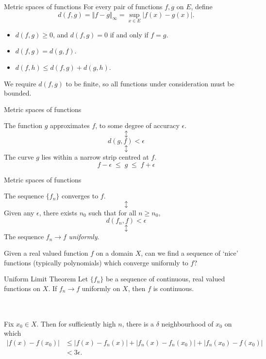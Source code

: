 \documentclass{beamer}
\begin{document}
    \begin{frame}{Metric spaces of functions}
        For every pair of functions $f, g$ on $E$, define \[
            d(f, g) = \Vert f - g\Vert_\infty = \sup_{x \in E} |f(x) - g(x)|.
        \] 

        \begin{itemize}
            \item $d(f, g) \geq 0$, and $d(f, g) = 0$ if and only if $f = g$.
            \item $d(f, g) = d(g, f)$.
            \item $d(f, h) \leq d(f, g) + d(g, h)$.
        \end{itemize}

        We require $d(f, g)$ to be finite, so all functions under consideration must be
        bounded.
    \end{frame}

    \begin{frame}{Metric spaces of functions}
    \begin{center}
    The function $g$ approximates $f$, to some degree of accuracy $\epsilon$.
    \[\updownarrow\]
    \[
        d(g, f) < \epsilon
    \]
    \[\updownarrow\]
    The curve $g$ lies within a narrow strip centred at $f$.
    \[
        f - \epsilon \;\leq\; g \;\leq\; f + \epsilon
    \] 
    \end{center}
    \end{frame}
   
    \begin{frame}{Metric spaces of functions}
    \begin{center}
        The sequence $\{f_n\}$ converges to $f$.
        \[\updownarrow\]
        Given any $\epsilon$, there exists $n_0$ such that for all $n \geq n_0$,
        \[
        d(f_n, f) < \epsilon
        \]
        \[\updownarrow\]
        The sequence $f_n \to f$ \emph{uniformly}.
    \end{center}
    \end{frame}

    \begin{frame}
        Given a real valued function $f$ on a domain $X$, can we find a sequence of
        `nice' functions (typically polynomials) which converge uniformly to $f$?
    \end{frame}
   
    \begin{frame}{Uniform Limit Theorem}
        Let $\{f_n\}$ be a sequence of continuous, real valued functions on $X$. If
        $f_n \to f$ uniformly on $X$, then $f$ is continuous.

        \\~\\

        Fix $x_0 \in X$. Then for sufficiently high $n$, there is a $\delta$
        neighbourhood of $x_0$ on which
        \begin{align*}
            |f(x) - f(x_0)|
                &\leq |f(x) - f_n(x)| + |f_n(x) - f_n(x_0)| + |f_n(x_0) - f(x_0)| \\
                &< 3\epsilon. \tag*{\qed}
        \end{align*}
    \end{frame}
    
\end{document}
